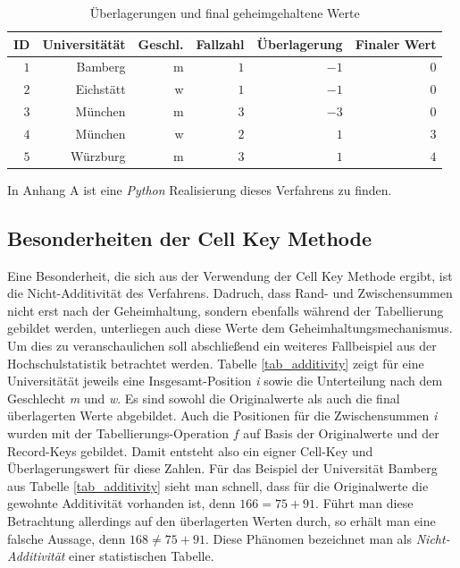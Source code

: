 \begin{table}[h]
    \centering
    \begin{tabular}{ r r r r r r}
        \textbf{ID} \vline & \textbf{Universitätät} & \textbf{Geschl.} & \textbf{Fallzahl} & \textbf{Überlagerung} & \textbf{Finaler Wert} \\ 
        \hline
        $1$ \vline & Bamberg & m & $1$ & $-1$ & $0$ \\
        $2$ \vline & Eichstätt & w & $1$ & $-1$ & $0$ \\
        $3$ \vline & München & m & $3$ & $-3$ & $0$ \\
        $4$ \vline & München & w & $2$ & $1$ & $3$ \\
        $5$ \vline & Würzburg & m & $3$ & $1$ & $4$
    \end{tabular}
    \caption{Überlagerungen und final geheimgehaltene Werte}
    \label{tab_final}
\end{table}

In Anhang A ist eine \textit{Python} Realisierung dieses Verfahrens zu finden.


\subsection{Besonderheiten der Cell Key Methode}%

Eine Besonderheit, die sich aus der Verwendung der Cell Key Methode ergibt, ist die Nicht-Additivität des Verfahrens. Dadruch, dass Rand- und Zwischensummen nicht erst nach der Geheimhaltung, sondern ebenfalls während der Tabellierung gebildet werden, unterliegen auch diese Werte dem Geheimhaltungsmechanismus. Um dies zu veranschaulichen soll abschlie\ss end ein weiteres Fallbeispiel aus der Hochschulstatistik betrachtet werden. Tabelle \ref{tab_additivity} zeigt für eine Universitätät jeweils eine Insgesamt-Position \textit{i} sowie die Unterteilung nach dem Geschlecht \textit{m} und \textit{w}. Es sind sowohl die Originalwerte als auch die final überlagerten Werte abgebildet. Auch die Positionen für die Zwischensummen \textit{i} wurden mit der Tabellierungs-Operation $f$ auf Basis der Originalwerte und der Record-Keys gebildet. Damit entsteht also ein eigner Cell-Key und Überlagerungswert für diese Zahlen. Für das Beispiel der Universität Bamberg aus Tabelle \ref{tab_additivity} sieht man schnell, dass für die Originalwerte die gewohnte Additivität vorhanden ist, denn $166 = 75 + 91$. Führt man diese Betrachtung allerdings auf den überlagerten Werten durch, so erhält man eine falsche Aussage, denn $168 \neq 75 + 91$. Diese Phänomen bezeichnet man als \textit{Nicht-Additivität} einer statistischen Tabelle.

